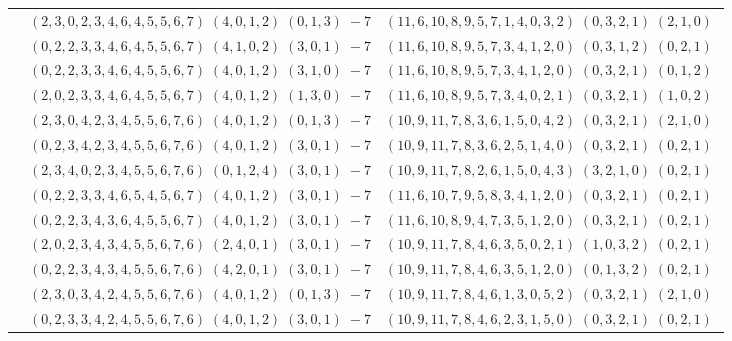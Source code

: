 \documentclass[11pt]{article}
\begin{document}
\begin{longtable}[l]{|c|c|c|}
 \cline{2-3} 
 & $(2 ,3 ,0 ,2 ,3 ,4 ,6 ,4 ,5 ,5 ,6 ,7) \;(4 ,0 ,1 ,2) \;(0 ,1 ,3) \;-7$ & $(11 ,6 ,10 ,8 ,9 ,5 ,7 ,1 ,4 ,0 ,3 ,2) \;(0 ,3 ,2 ,1) \;(2 ,1 ,0) \;$\\ 
 \cline{2-3} 
 & $(0 ,2 ,2 ,3 ,3 ,4 ,6 ,4 ,5 ,5 ,6 ,7) \;(4 ,1 ,0 ,2) \;(3 ,0 ,1) \;-7$ & $(11 ,6 ,10 ,8 ,9 ,5 ,7 ,3 ,4 ,1 ,2 ,0) \;(0 ,3 ,1 ,2) \;(0 ,2 ,1) \;$\\ 
 \cline{2-3} 
 & $(0 ,2 ,2 ,3 ,3 ,4 ,6 ,4 ,5 ,5 ,6 ,7) \;(4 ,0 ,1 ,2) \;(3 ,1 ,0) \;-7$ & $(11 ,6 ,10 ,8 ,9 ,5 ,7 ,3 ,4 ,1 ,2 ,0) \;(0 ,3 ,2 ,1) \;(0 ,1 ,2) \;$\\ 
 \cline{2-3} 
 & $(2 ,0 ,2 ,3 ,3 ,4 ,6 ,4 ,5 ,5 ,6 ,7) \;(4 ,0 ,1 ,2) \;(1 ,3 ,0) \;-7$ & $(11 ,6 ,10 ,8 ,9 ,5 ,7 ,3 ,4 ,0 ,2 ,1) \;(0 ,3 ,2 ,1) \;(1 ,0 ,2) \;$\\ 
 \cline{2-3} 
 & $(2 ,3 ,0 ,4 ,2 ,3 ,4 ,5 ,5 ,6 ,7 ,6) \;(4 ,0 ,1 ,2) \;(0 ,1 ,3) \;-7$ & $(10 ,9 ,11 ,7 ,8 ,3 ,6 ,1 ,5 ,0 ,4 ,2) \;(0 ,3 ,2 ,1) \;(2 ,1 ,0) \;$\\ 
 \cline{2-3} 
 & $(0 ,2 ,3 ,4 ,2 ,3 ,4 ,5 ,5 ,6 ,7 ,6) \;(4 ,0 ,1 ,2) \;(3 ,0 ,1) \;-7$ & $(10 ,9 ,11 ,7 ,8 ,3 ,6 ,2 ,5 ,1 ,4 ,0) \;(0 ,3 ,2 ,1) \;(0 ,2 ,1) \;$\\ 
 \cline{2-3} 
 & $(2 ,3 ,4 ,0 ,2 ,3 ,4 ,5 ,5 ,6 ,7 ,6) \;(0 ,1 ,2 ,4) \;(3 ,0 ,1) \;-7$ & $(10 ,9 ,11 ,7 ,8 ,2 ,6 ,1 ,5 ,0 ,4 ,3) \;(3 ,2 ,1 ,0) \;(0 ,2 ,1) \;$\\ 
 \cline{2-3} 
 & $(0 ,2 ,2 ,3 ,3 ,4 ,6 ,5 ,4 ,5 ,6 ,7) \;(4 ,0 ,1 ,2) \;(3 ,0 ,1) \;-7$ & $(11 ,6 ,10 ,7 ,9 ,5 ,8 ,3 ,4 ,1 ,2 ,0) \;(0 ,3 ,2 ,1) \;(0 ,2 ,1) \;$\\ 
 \cline{2-3} 
 & $(0 ,2 ,2 ,3 ,4 ,3 ,6 ,4 ,5 ,5 ,6 ,7) \;(4 ,0 ,1 ,2) \;(3 ,0 ,1) \;-7$ & $(11 ,6 ,10 ,8 ,9 ,4 ,7 ,3 ,5 ,1 ,2 ,0) \;(0 ,3 ,2 ,1) \;(0 ,2 ,1) \;$\\ 
 \cline{2-3} 
 & $(2 ,0 ,2 ,3 ,4 ,3 ,4 ,5 ,5 ,6 ,7 ,6) \;(2 ,4 ,0 ,1) \;(3 ,0 ,1) \;-7$ & $(10 ,9 ,11 ,7 ,8 ,4 ,6 ,3 ,5 ,0 ,2 ,1) \;(1 ,0 ,3 ,2) \;(0 ,2 ,1) \;$\\ 
 \cline{2-3} 
 & $(0 ,2 ,2 ,3 ,4 ,3 ,4 ,5 ,5 ,6 ,7 ,6) \;(4 ,2 ,0 ,1) \;(3 ,0 ,1) \;-7$ & $(10 ,9 ,11 ,7 ,8 ,4 ,6 ,3 ,5 ,1 ,2 ,0) \;(0 ,1 ,3 ,2) \;(0 ,2 ,1) \;$\\ 
 \cline{2-3} 
 & $(2 ,3 ,0 ,3 ,4 ,2 ,4 ,5 ,5 ,6 ,7 ,6) \;(4 ,0 ,1 ,2) \;(0 ,1 ,3) \;-7$ & $(10 ,9 ,11 ,7 ,8 ,4 ,6 ,1 ,3 ,0 ,5 ,2) \;(0 ,3 ,2 ,1) \;(2 ,1 ,0) \;$\\ 
 \cline{2-3} 
 & $(0 ,2 ,3 ,3 ,4 ,2 ,4 ,5 ,5 ,6 ,7 ,6) \;(4 ,0 ,1 ,2) \;(3 ,0 ,1) \;-7$ & $(10 ,9 ,11 ,7 ,8 ,4 ,6 ,2 ,3 ,1 ,5 ,0) \;(0 ,3 ,2 ,1) \;(0 ,2 ,1) \;$\\ 

\end{longtable}
\end{document}
